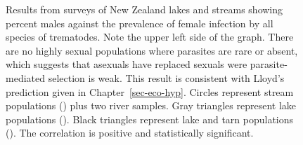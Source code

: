 \documentclass[
  letterpaper,
]{book}
\begin{document}
\begin{figure}


\caption[Results from surveys of New Zealand lakes and streams showing
percent males against the prevalence of female infection by all species
of trematodes]{\label{fig-3-5}Results from surveys of New Zealand lakes
and streams showing percent males against the prevalence of female
infection by all species of trematodes. Note the upper left side of the
graph. There are no highly sexual populations where parasites are rare
or absent, which suggests that asexuals have replaced sexuals were
parasite-mediated selection is weak. This result is consistent with
Lloyd's prediction given in Chapter~\ref{sec-eco-hyp}. Circles represent
stream populations () plus two
river samples. Gray triangles represent lake populations
(). Black triangles represent
lake and tarn populations (). The
correlation is positive and statistically significant.}

\end{figure}%
\end{document}

